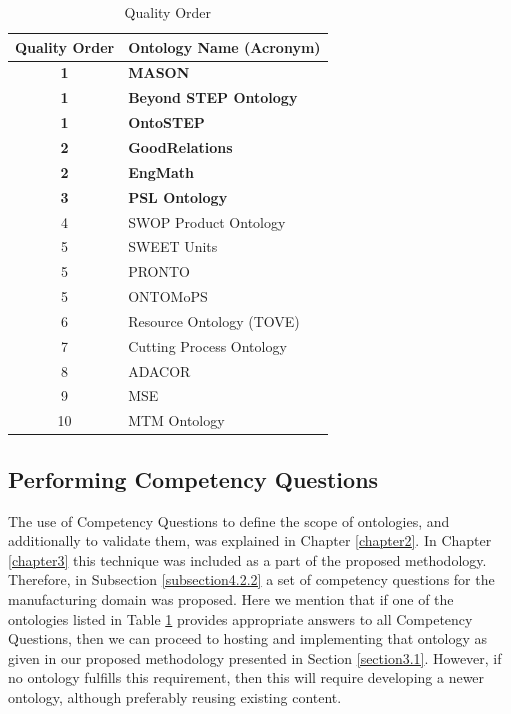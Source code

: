 \begin{table}[tp]%
	
	\caption{Quality Order}
	\label{table4.2}\centering %
	\begin{tabular}{cl}
		\toprule %
		Quality Order &	Ontology Name (Acronym) \\\toprule
		
		\textbf{1}&	\textbf{MASON} \\\toprule
		\textbf{1}&	\textbf{Beyond STEP Ontology}\\\toprule
		\textbf{1}&	\textbf{OntoSTEP}\\\toprule
		\textbf{2}&	\textbf{GoodRelations}\\\toprule
		\textbf{2}&	\textbf{EngMath}\\\toprule
		\textbf{3}&	\textbf{PSL Ontology}\\\toprule
		4&	SWOP Product Ontology \\\toprule
		5&	SWEET Units\\\toprule
		5&	PRONTO\\\toprule
		5&	ONTOMoPS\\\toprule
		6&	Resource Ontology (TOVE)\\\toprule
		7&	Cutting Process Ontology\\\toprule
		8&	ADACOR\\\toprule
		9&	MSE\\\toprule
		10&	MTM Ontology\\\toprule
		
		
		
		
	\end{tabular}
	
	
\end{table}



\subsection{Performing Competency Questions}\label{subsection4.2.3}

The use of Competency Questions to define the scope of ontologies, and additionally to validate them, was explained in Chapter \ref{chapter2}. In Chapter \ref{chapter3} this technique was included as a part of the proposed methodology.   Therefore, in Subsection \ref{subsection4.2.2} a set of competency questions for the manufacturing domain was proposed. Here we mention that if one of the ontologies listed in  Table \ref{table4.2} provides appropriate answers to all Competency Questions, then we can proceed to hosting and implementing that ontology as given in our proposed methodology presented in Section \ref{section3.1}. However, if no ontology fulfills this requirement, then this will require developing a newer ontology, although preferably reusing existing content.  

